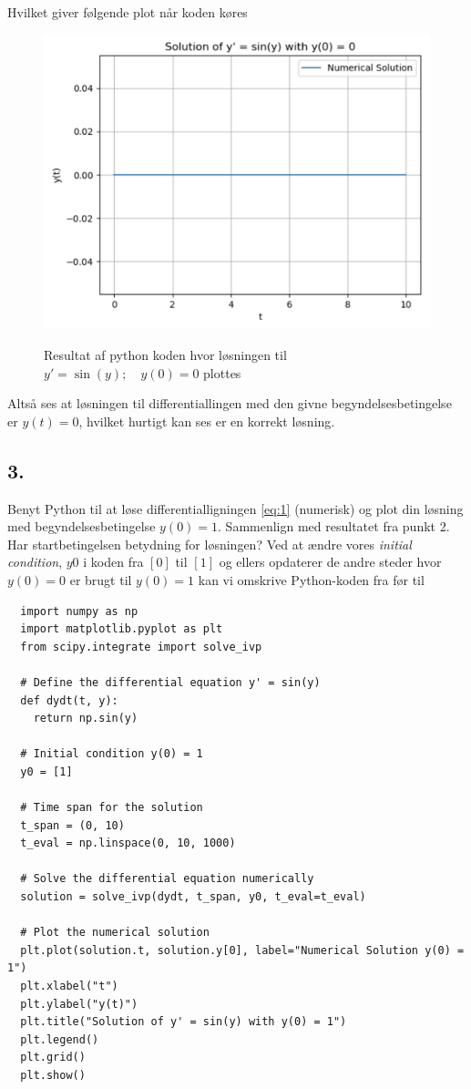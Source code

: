 \documentclass[12pt]{article}
\theoremstyle{definition}
\begin{document}
Hvilket giver følgende plot når koden køres
\begin{figure} [ht]
  \centering
  \caption{Resultat af python koden hvor løsningen til $y' = \sin(y); \quad y(0) = 0$ plottes}
  \includegraphics[width=0.8\linewidth]{../figures/A11_1.png}
  \label{fig:A11_1}
\end{figure}

Altså ses at løsningen til differentiallingen med den givne begyndelsesbetingelse er $y(t) = 0$, hvilket hurtigt kan ses er en korrekt løsning.


\subsection*{3.}
Benyt Python til at løse differentialligningen \ref{eq:1} (numerisk) og plot din løsning med begyndelsesbetingelse $y(0) = 1$. Sammenlign med resultatet fra punkt 2. Har startbetingelsen betydning for løsningen?
\bigbreak
Ved at ændre vores \textit{initial condition}, $y0$ i koden fra $[0]$ til $[1]$ og ellers opdaterer de andre steder hvor $y(0) = 0$ er brugt til $y(0) = 1$ kan vi omskrive Python-koden fra før til

\begin{verbatim}
  import numpy as np
  import matplotlib.pyplot as plt
  from scipy.integrate import solve_ivp

  # Define the differential equation y' = sin(y)
  def dydt(t, y):
    return np.sin(y)

  # Initial condition y(0) = 1
  y0 = [1]

  # Time span for the solution
  t_span = (0, 10)
  t_eval = np.linspace(0, 10, 1000)

  # Solve the differential equation numerically
  solution = solve_ivp(dydt, t_span, y0, t_eval=t_eval)

  # Plot the numerical solution
  plt.plot(solution.t, solution.y[0], label="Numerical Solution y(0) = 1")
  plt.xlabel("t")
  plt.ylabel("y(t)")
  plt.title("Solution of y' = sin(y) with y(0) = 1")
  plt.legend()
  plt.grid()
  plt.show()
\end{verbatim}
\end{document}

